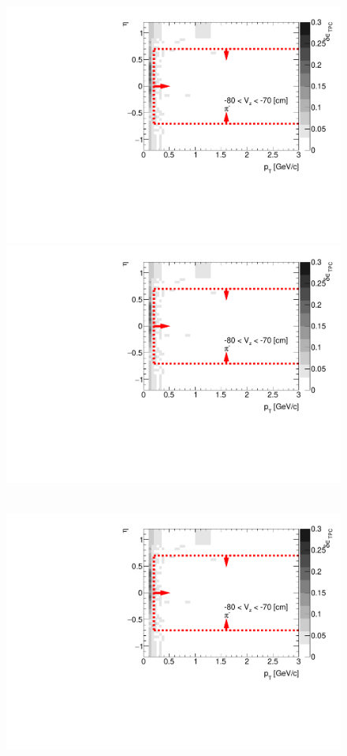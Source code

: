 \begin{figure}[hb]
{  \includegraphics[width=\linewidth,page=5]{graphics/systematicsEfficiency/deadMaterial/secondaries_Unbinned_CD_.pdf}\\
  \includegraphics[width=\linewidth,page=7]{graphics/systematicsEfficiency/deadMaterial/secondaries_Unbinned_CD_.pdf}\\
}~
\parbox{0.495\textwidth}{
  \centering
  \includegraphics[width=\linewidth,page=2]{graphics/systematicsEfficiency/deadMaterial/secondaries_Unbinned_CD_.pdf}\\
}
\end{figure}
